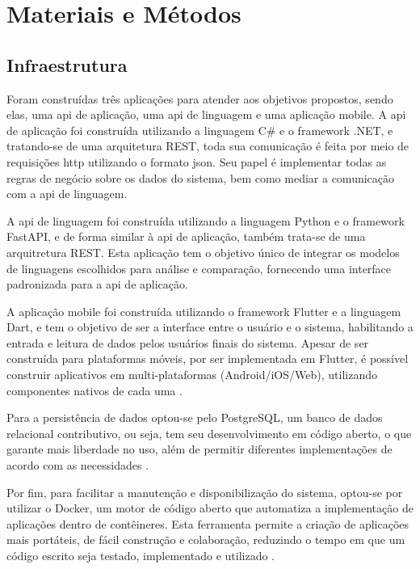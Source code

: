 \chapter{Materiais e Métodos}\label{cap:materialemetodos}

\section{Infraestrutura}\label{sec:infraestrutura}

Foram construídas três aplicações para atender aos objetivos propostos, sendo elas, uma \gls{api} de aplicação, uma \gls{api} de linguagem e uma aplicação mobile. A api de aplicação foi construída utilizando a linguagem C{\#} e o framework .NET, e tratando-se de uma arquitetura REST, toda sua comunicação é feita por meio de requisições \gls{http} utilizando o formato \gls{json}. Seu papel é implementar todas as regras de negócio sobre os dados do sistema, bem como mediar a comunicação com a \gls{api} de linguagem.

A \gls{api} de linguagem foi construída utilizando a linguagem Python e o framework FastAPI, e de forma similar à \gls{api} de aplicação, também trata-se de uma arquitretura REST. Esta aplicação tem o objetivo único de integrar os modelos de linguagens escolhidos para análise e comparação, fornecendo uma interface padronizada para a \gls{api} de aplicação.

A aplicação mobile foi construída utilizando o framework Flutter e a linguagem Dart, e tem o objetivo de ser a interface entre o usuário e o sistema, habilitando a entrada e leitura de dados pelos usuários finais do sistema. Apesar de ser construída para plataformas móveis, por ser implementada em Flutter, é possível construir aplicativos em multi-plataformas (Android/iOS/Web), utilizando componentes nativos de cada uma \cite{Flutter}.

Para a persistência de dados optou-se pelo PostgreSQL, um banco de dados relacional contributivo, ou seja, tem seu desenvolvimento em código aberto, o que garante mais liberdade no uso, além de permitir diferentes implementações de acordo com as necessidades \cite{PostgreSQL}.

Por fim, para facilitar a manutenção e disponibilização do sistema, optou-se por utilizar o Docker, um motor de código aberto que automatiza a implementação de aplicações dentro de contêineres. Esta ferramenta permite a criação de aplicações mais portáteis, de fácil construção e colaboração, reduzindo o tempo em que um código escrito seja testado, implementado e utilizado \cite{TheDockerBook}.

